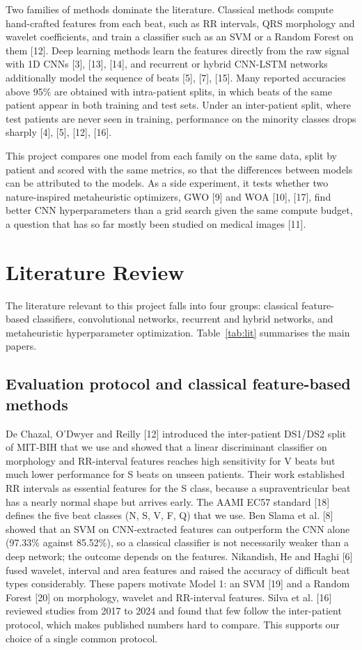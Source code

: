 \documentclass[11pt,a4paper]{article}
\begin{document}
Two families of methods dominate the literature. Classical methods compute hand-crafted features from each beat, such as RR intervals, QRS morphology and wavelet coefficients, and train a classifier such as an SVM or a Random Forest on them [12]. Deep learning methods learn the features directly from the raw signal with 1D CNNs [3], [13], [14], and recurrent or hybrid CNN-LSTM networks additionally model the sequence of beats [5], [7], [15]. Many reported accuracies above 95\% are obtained with intra-patient splits, in which beats of the same patient appear in both training and test sets. Under an inter-patient split, where test patients are never seen in training, performance on the minority classes drops sharply [4], [5], [12], [16].

This project compares one model from each family on the same data, split by patient and scored with the same metrics, so that the differences between models can be attributed to the models. As a side experiment, it tests whether two nature-inspired metaheuristic optimizers, GWO [9] and WOA [10], [17], find better CNN hyperparameters than a grid search given the same compute budget, a question that has so far mostly been studied on medical images [11].

\section{Literature Review}
The literature relevant to this project falls into four groups: classical feature-based classifiers, convolutional networks, recurrent and hybrid networks, and metaheuristic hyperparameter optimization. Table~\ref{tab:lit} summarises the main papers.

\subsection{Evaluation protocol and classical feature-based methods}
De Chazal, O'Dwyer and Reilly [12] introduced the inter-patient DS1/DS2 split of MIT-BIH that we use and showed that a linear discriminant classifier on morphology and RR-interval features reaches high sensitivity for V beats but much lower performance for S beats on unseen patients. Their work established RR intervals as essential features for the S class, because a supraventricular beat has a nearly normal shape but arrives early. The AAMI EC57 standard [18] defines the five beat classes (N, S, V, F, Q) that we use. Ben Slama et al. [8] showed that an SVM on CNN-extracted features can outperform the CNN alone (97.33\% against 85.52\%), so a classical classifier is not necessarily weaker than a deep network; the outcome depends on the features. Nikandish, He and Haghi [6] fused wavelet, interval and area features and raised the accuracy of difficult beat types considerably. These papers motivate Model 1: an SVM [19] and a Random Forest [20] on morphology, wavelet and RR-interval features. Silva et al. [16] reviewed studies from 2017 to 2024 and found that few follow the inter-patient protocol, which makes published numbers hard to compare. This supports our choice of a single common protocol.
\end{document}
